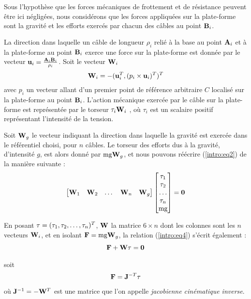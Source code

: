 Sous l'hypothèse que les forces mécaniques de frottement et de résistance 
peuvent être ici négligées, nous considérons que les forces appliqu\'ees sur la 
plate-forme sont la gravit\'e et les efforts exercés par chacun des câbles au 
point ${\bf B}_i$.

La direction dans laquelle un câble de longueur $\rho_i$ relié à la base au 
point ${\bf A}_i$ et à la plate-forme au point ${\bf B}_i$ exerce une force sur 
la plate-forme est donnée par le vecteur ${\bf u}_i = \frac{{\bf A}_i{\bf 
B}_i}{\rho_i}$. Soit le vecteur ${\bf W}_i$
\begin{equation}
{\bf W}_i = -({\bf u}_i^T, (p_i \times {\bf u}_i)^T)^T
\label{intro:eq3}
\end{equation}
avec $p_i$ un vecteur allant d'un premier point de référence arbitraire 
$C$ localisé sur la plate-forme au point ${\bf B}_i$. L'action m\'ecanique 
exercée par le câble sur la plate-forme est représentée par le torseur $ \tau_i 
{\bf W}_i$ , où $\tau_i$ est un scalaire positif représentant l'intensité de la 
tension.

Soit ${\bf W}_g$ le vecteur indiquant la direction dans laquelle la gravité est 
exercée dans le référentiel choisi, pour $n$ câbles. Le torseur des efforts dus 
à la gravité, d'intensit\'e $g$, est alors donné par $\hbox{mg} {\bf W}_g$, et 
nous pouvons réécrire (\ref{intro:eq2}) de la manière suivante :
\begin{equation}
\begin{bmatrix}
 {\bf W}_1 & {\bf W}_2 & \dots & {\bf W}_n & {\bf W}_g
\end{bmatrix}
\begin{bmatrix}
 \tau_1 \\ \tau_2 \\ \dots \\ \tau_n \\ \hbox{mg}
\end{bmatrix}
= {\bf 0}
\label{intro:eq4}
\end{equation}

En posant ${\bf \tau} = (\tau_1, \tau_2, \dots, \tau_n)^T$, ${\bf W}$ la 
matrice $6 \times n$ dont les colonnes sont les $n$ vecteurs ${\bf W}_i$, et 
en isolant $\mathcal {\bf F} = \hbox{mg} {\bf W}_g$, la relation 
(\ref{intro:eq4}) s'écrit également :
\begin{equation}
\mathcal {\bf F} + {\bf W} \tau = {\bf 0}
\label{intro:eq5a}
\end{equation}

soit  
\begin{equation}
\mathcal {\bf F} = {\bf J}^{-T} {\bf \tau}
\label{intro:eq5b}
\end{equation}
où ${\bf J}^{-1} = - {\bf W}^T$ est une matrice que l'on appelle {\it 
jacobienne cin\'ematique inverse}.

